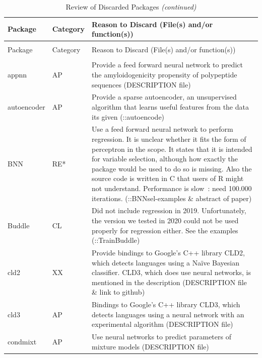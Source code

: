 \begin{Schunk}
\begingroup\fontsize{7}{9}\selectfont

\begin{longtable}[t]{ll>{\raggedright\arraybackslash}p{10cm}}
\caption{\label{tab:unnamed-chunk-9}Review of Discarded Packages}\\
\toprule
Package & Category & Reason to Discard (File(s) and/or function(s))\\
\midrule
\endfirsthead
\caption[]{Review of Discarded Packages \textit{(continued)}}\\
\toprule
Package & Category & Reason to Discard (File(s) and/or function(s))\\
\midrule
\endhead

\endfoot
\bottomrule
\multicolumn{3}{l}{\rule{0pt}{1em}\textit{Note: } AP=Application, CL=Classification, RE=Regression, RE*=?, TS=Time serie, UT=Utility, XX=Other.}\\
\endlastfoot
appnn & AP & Provide a feed forward neural network to predict the amyloidogenicity propensity of polypeptide sequences (DESCRIPTION file)\\
autoencoder & AP & Provide a sparse autoencoder, an unsupervised algorithm that learns useful features from the data its given (::autoencode)\\
BNN & RE* & Use a feed forward neural network to perform regression. It is unclear whether it fits the form of perceptron in the scope. It states that it is intended for variable selection, although how exactly the package would be used to do so is missing. Also the source code is written in C that users of R might not understand. Performance is slow : need 100.000 iterations. (::BNNsel-examples \& abstract of paper)\\
Buddle & CL & Did not include regression in 2019. Unfortunately, the version we tested in 2020 could not be used properly for regression either. See the examples (::TrainBuddle)\\
cld2 & XX & Provide bindings to Google's C++ library CLD2, which detects languages using a Naïve Bayesian classifier. CLD3, which does use neural networks, is mentioned in the description (DESCRIPTION file \& link to github)\\
\addlinespace
cld3 & AP & Bindings to Google's C++ library CLD3, which detects languages using a neural network with an experimental algorithm (DESCRIPTION file)\\
condmixt & AP & Use neural networks to predict parameters of mixture models (DESCRIPTION file)\\

\end{longtable}
\end{Schunk}
